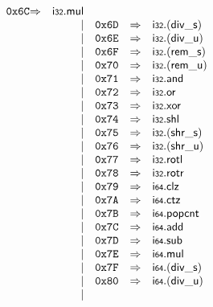 $$\begin{array}{@{}l@{}rrlll@{}l@{}}
\mathtt{0x6C} &\Rightarrow& \mathsf{i{\scriptstyle32}} . \mathsf{mul} \\ &&|&
\mathtt{0x6D} &\Rightarrow& \mathsf{i{\scriptstyle32}} . ({\mathsf{div\_}}{\mathsf{s}}) \\ &&|&
\mathtt{0x6E} &\Rightarrow& \mathsf{i{\scriptstyle32}} . ({\mathsf{div\_}}{\mathsf{u}}) \\ &&|&
\mathtt{0x6F} &\Rightarrow& \mathsf{i{\scriptstyle32}} . ({\mathsf{rem\_}}{\mathsf{s}}) \\ &&|&
\mathtt{0x70} &\Rightarrow& \mathsf{i{\scriptstyle32}} . ({\mathsf{rem\_}}{\mathsf{u}}) \\ &&|&
\mathtt{0x71} &\Rightarrow& \mathsf{i{\scriptstyle32}} . \mathsf{and} \\ &&|&
\mathtt{0x72} &\Rightarrow& \mathsf{i{\scriptstyle32}} . \mathsf{or} \\ &&|&
\mathtt{0x73} &\Rightarrow& \mathsf{i{\scriptstyle32}} . \mathsf{xor} \\ &&|&
\mathtt{0x74} &\Rightarrow& \mathsf{i{\scriptstyle32}} . \mathsf{shl} \\ &&|&
\mathtt{0x75} &\Rightarrow& \mathsf{i{\scriptstyle32}} . ({\mathsf{shr\_}}{\mathsf{s}}) \\ &&|&
\mathtt{0x76} &\Rightarrow& \mathsf{i{\scriptstyle32}} . ({\mathsf{shr\_}}{\mathsf{u}}) \\ &&|&
\mathtt{0x77} &\Rightarrow& \mathsf{i{\scriptstyle32}} . \mathsf{rotl} \\ &&|&
\mathtt{0x78} &\Rightarrow& \mathsf{i{\scriptstyle32}} . \mathsf{rotr} \\ &&|&
\mathtt{0x79} &\Rightarrow& \mathsf{i{\scriptstyle64}} . \mathsf{clz} \\ &&|&
\mathtt{0x7A} &\Rightarrow& \mathsf{i{\scriptstyle64}} . \mathsf{ctz} \\ &&|&
\mathtt{0x7B} &\Rightarrow& \mathsf{i{\scriptstyle64}} . \mathsf{popcnt} \\ &&|&
\mathtt{0x7C} &\Rightarrow& \mathsf{i{\scriptstyle64}} . \mathsf{add} \\ &&|&
\mathtt{0x7D} &\Rightarrow& \mathsf{i{\scriptstyle64}} . \mathsf{sub} \\ &&|&
\mathtt{0x7E} &\Rightarrow& \mathsf{i{\scriptstyle64}} . \mathsf{mul} \\ &&|&
\mathtt{0x7F} &\Rightarrow& \mathsf{i{\scriptstyle64}} . ({\mathsf{div\_}}{\mathsf{s}}) \\ &&|&
\mathtt{0x80} &\Rightarrow& \mathsf{i{\scriptstyle64}} . ({\mathsf{div\_}}{\mathsf{u}}) \\ &&|&

\end{array}$$
